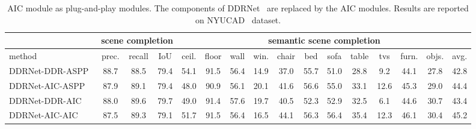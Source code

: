\begin{table*}[t]
\begin{center}
\scalebox{0.88}
{
\begin{tabular} {l |c c c|c c c c c c c c c c c|c} \hline
 &  \multicolumn{3}{c|}{scene completion} & \multicolumn{12}{c}{semantic scene completion} \\ 
\hline
method  & prec. & recall & IoU & \cellcolor{rgb1}ceil. & \cellcolor{rgb2}floor & \cellcolor{rgb3}wall & \cellcolor{rgb4}win. & \cellcolor{rgb5}chair & \cellcolor{rgb6}bed & \cellcolor{rgb7}sofa & \cellcolor{rgb8}table & \cellcolor{rgb9}tvs & \cellcolor{rgb10}furn. & \cellcolor{rgb11}objs. & avg. \\ 
\hline
DDRNet-DDR-ASPP~\cite{li2019rgbd}   &  88.7 & 88.5 & 79.4 & 54.1 & 91.5 & 56.4 & 14.9 & 37.0 & 55.7 & 51.0 &  28.8 & 9.2 & 44.1 &  27.8 & 42.8 \\

DDRNet-AIC-ASPP & 87.9 & 89.1 & 79.4 & 48.0 & 90.9 & 56.1 & 20.1 & 41.6 & 56.6 & 55.0 & 33.1 & 12.6 & 45.3 & 29.0 & 44.4 \\

DDRNet-DDR-AIC &88.0 & 89.6 & 79.7 & 49.0 & 91.4 & 57.6 & 19.7 & 40.5 & 52.3 & 52.9 & 32.5 & 6.1 & 44.6 & 30.7 & 43.4\\

DDRNet-AIC-AIC & 87.5 & 89.3 & 79.1 & 51.7 & 91.5 & 56.4 &   16.5 &   44.1 &  56.3 &  56.4 &  35.4 &  12.3 &  46.1 & 30.4 & 45.2 \\

\hline

\end{tabular}
}  \caption{AIC module as plug-and-play modules. The components of DDRNet~\cite{li2019rgbd} are replaced by the AIC modules. Results are reported on NYUCAD~\cite{zheng2013beyond} dataset.}
\vspace{-0.6cm}
\label{tab:AIC}
\end{center}
\end{table*}
